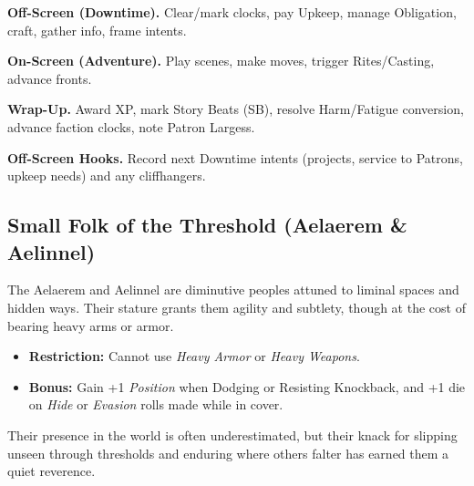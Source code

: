 \textbf{Off-Screen (Downtime).} Clear/mark clocks, pay Upkeep, manage Obligation, craft, gather info, frame intents.

\textbf{On-Screen (Adventure).} Play scenes, make moves, trigger Rites/Casting, advance fronts.

\textbf{Wrap-Up.} Award XP, mark Story Beats (SB), resolve Harm/Fatigue conversion, advance faction clocks, note Patron Largess.

\textbf{Off-Screen Hooks.} Record next Downtime intents (projects, service to Patrons, upkeep needs) and any cliffhangers.

\subsection{Small Folk of the Threshold (Aelaerem \& Aelinnel)}
\label{subsec:small-folk-threshold}


The Aelaerem and Aelinnel are diminutive peoples attuned to liminal spaces and hidden ways. Their stature grants them agility and subtlety, though at the cost of bearing heavy arms or armor.

\begin{itemize}
  \item \textbf{Restriction:} Cannot use \emph{Heavy Armor} or \emph{Heavy Weapons}.
  \item \textbf{Bonus:} Gain +1 \emph{Position} when Dodging or Resisting Knockback, and +1 die on \emph{Hide} or \emph{Evasion} rolls made while in cover.
\end{itemize}

Their presence in the world is often underestimated, but their knack for slipping unseen through thresholds and enduring where others falter has earned them a quiet reverence.